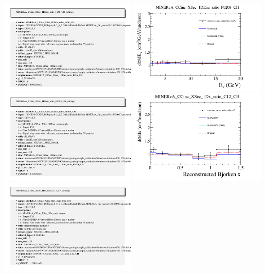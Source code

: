 \documentclass{article}
\begin{document}
\includegraphics[width=0.49\textwidth]{figures/minerva_numu_ccincratio_enuFe_info.png}
\centering
\includegraphics[width=0.49\textwidth]{figures/minerva_numu_ccincratio_enuPb_comp.png}
\includegraphics[width=0.49\textwidth]{figures/minerva_numu_ccincratio_enuPb_info.png}
\centering
\includegraphics[width=0.49\textwidth]{figures/minerva_numu_ccincratio_xC_comp.png}
\includegraphics[width=0.49\textwidth]{figures/minerva_numu_ccincratio_xC_info.png}
\end{document}
